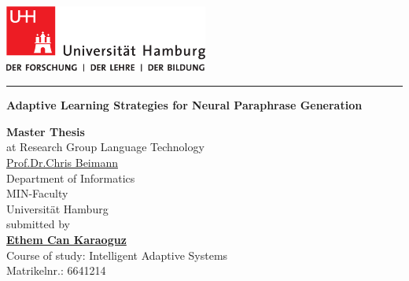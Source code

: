 \documentclass[12pt,final,twoside]{report}
\author{\trauthor}
\makeatletter
\newcommand{\trtitle}{Adaptive Learning Strategies for Neural Paraphrase Generation}
\newcommand{\trtype}{Master Thesis} %
\newcommand{\trcourseofstudies}{Intelligent Adaptive Systems} %
\newcommand{\trauthor}{Ethem Can Karaoguz}
\newcommand{\trauthordegree}{} %
\newcommand{\tremail}{4karaoguz@informatik.uni-hamburg.de}
\newcommand{\trmatrikelnummer}{6641214}
\newcommand{\trgutachterA}{\href{mailto:beimann@informatik.uni-hamburg.de}{Prof.Dr.Chris Beimann}}
\newcommand{\trfach}{Language Technology}
\theoremstyle{plain}
\theoremstyle{definition}
\theoremstyle{remark}
\makeatother
\begin{document}
\renewcommand{\headheight}{14.5pt}      %

\thispagestyle{empty}
\fancyhead[LO,RE]{}                     %


\begin{titlepage}
    \begin{flushleft}
        \includegraphics[width=67mm, scale =1.5]{uhhLogoL.pdf}\\
    \end{flushleft}
    \rule{\textwidth}{0.4pt}
        \newline
        \vspace{2.0cm}
        \begin{center}
          \LARGE \textbf{\trtitle}
        \end{center}
    \vspace{2.0cm}
    \begin{center}
      \textbf{\trtype}\\
      at Research Group \trfach\\
      \trgutachterA\medskip\\
      Department of Informatics\\
      MIN-Faculty\\
      Universit\"at Hamburg \\[1.0cm] %
      submitted by \\
      \textbf{\href{mailto:\tremail}{\trauthor\trauthordegree}}\\
      Course of study:   \trcourseofstudies \\
      Matrikelnr.:  \trmatrikelnummer \\

\end{center}
\end{titlepage}
\end{document}

